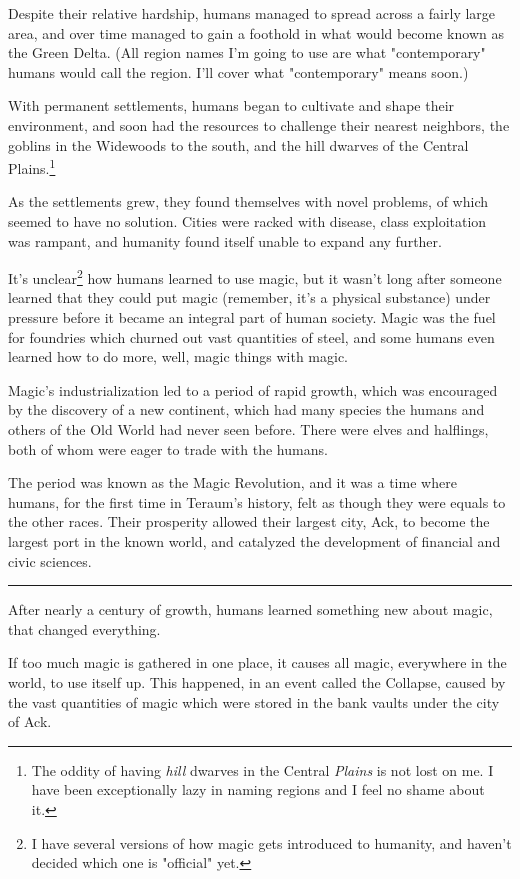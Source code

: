 \documentclass[11pt]{article}
\begin{document}
Despite their relative hardship, humans managed to spread across a
fairly large area, and over time managed to gain a foothold in what
would become known as the Green Delta. (All region names I'm going to
use are what "contemporary" humans would call the region. I'll cover
what "contemporary" means soon.)

With permanent settlements, humans began to cultivate and shape their
environment, and soon had the resources to challenge their nearest
neighbors, the goblins in the Widewoods to the south, and the hill
dwarves of the Central Plains.\footnote{The oddity of having \emph{hill} dwarves in the Central \emph{Plains} is
not lost on me. I have been exceptionally lazy in naming regions and I
feel no shame about it.}

As the settlements grew, they found themselves with novel problems, of
which seemed to have no solution. Cities were racked with disease,
class exploitation was rampant, and humanity found itself unable to
expand any further.

It's unclear\footnote{I have several versions of how magic gets introduced to
humanity, and haven't decided which one is "official" yet.} how humans learned to use magic, but it wasn't long
after someone learned that they could put magic (remember, it's a
physical substance) under pressure before it became an integral part
of human society. Magic was the fuel for foundries which churned out
vast quantities of steel, and some humans even learned how to do more,
well, magic things with magic.

Magic's industrialization led to a period of rapid growth, which was
encouraged by the discovery of a new continent, which had many species
the humans and others of the Old World had never seen before. There
were elves and halflings, both of whom were eager to trade with the
humans.

The period was known as the Magic Revolution, and it was a time where
humans, for the first time in Teraum's history, felt as though they
were equals to the other races. Their prosperity allowed their largest
city, Ack, to become the largest port in the known world, and
catalyzed the development of financial and civic sciences.

\noindent\rule{\textwidth}{0.5pt}

After nearly a century of growth, humans learned something new about
magic, that changed everything.

If too much magic is gathered in one place, it causes all magic,
everywhere in the world, to use itself up. This happened, in an event
called the Collapse, caused by the vast quantities of magic which were
stored in the bank vaults under the city of Ack.
\end{document}

